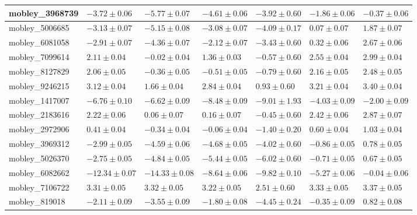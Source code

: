 \documentclass{article}
\begin{document}
\begin{landscape}
\begin{longtable}{|l{3.0cm}|l{3.0cm}|l{3.2cm}|l{3.6cm}|l{3.0cm}|l{3.0cm}|l{3.0cm}|}
mobley\_3968739	&	$	-3.72	\pm	0.06	$	&	$	-5.77	\pm	0.07	$	&	$	-4.61	\pm	0.06	$	&	$	-3.92	\pm	0.60	$	&	$	-1.86	\pm	0.06	$	&	$	-0.37	\pm	0.06	$	\\ \hline
mobley\_5006685	&	$	-3.13	\pm	0.07	$	&	$	-5.15	\pm	0.08	$	&	$	-3.08	\pm	0.07	$	&	$	-4.09	\pm	0.17	$	&	$	0.07	\pm	0.07	$	&	$	1.87	\pm	0.07	$	\\ \hline
mobley\_6081058	&	$	-2.91	\pm	0.07	$	&	$	-4.36	\pm	0.07	$	&	$	-2.12	\pm	0.07	$	&	$	-3.43	\pm	0.60	$	&	$	0.32	\pm	0.06	$	&	$	2.67	\pm	0.06	$	\\ \hline
mobley\_7099614	&	$	2.11	\pm	0.04	$	&	$	-0.02	\pm	0.04	$	&	$	1.36	\pm	0.03	$	&	$	-0.57	\pm	0.60	$	&	$	2.55	\pm	0.04	$	&	$	2.99	\pm	0.04	$	\\ \hline
mobley\_8127829	&	$	2.06	\pm	0.05	$	&	$	-0.36	\pm	0.05	$	&	$	-0.51	\pm	0.05	$	&	$	-0.79	\pm	0.60	$	&	$	2.16	\pm	0.05	$	&	$	2.48	\pm	0.05	$	\\ \hline
mobley\_9246215	&	$	3.12	\pm	0.04	$	&	$	1.66	\pm	0.04	$	&	$	2.84	\pm	0.04	$	&	$	0.93	\pm	0.60	$	&	$	3.21	\pm	0.04	$	&	$	3.40	\pm	0.04	$	\\ \hline
mobley\_1417007	&	$	-6.76	\pm	0.10	$	&	$	-6.62	\pm	0.09	$	&	$	-8.48	\pm	0.09	$	&	$	-9.01	\pm	1.93	$	&	$	-4.03	\pm	0.09	$	&	$	-2.00	\pm	0.09	$	\\ \hline
mobley\_2183616	&	$	2.22	\pm	0.06	$	&	$	0.06	\pm	0.07	$	&	$	0.16	\pm	0.07	$	&	$	-0.45	\pm	0.60	$	&	$	2.42	\pm	0.06	$	&	$	2.87	\pm	0.07	$	\\ \hline
mobley\_2972906	&	$	0.41	\pm	0.04	$	&	$	-0.34	\pm	0.04	$	&	$	-0.06	\pm	0.04	$	&	$	-1.40	\pm	0.20	$	&	$	0.60	\pm	0.04	$	&	$	1.03	\pm	0.04	$	\\ \hline
mobley\_3969312	&	$	-2.99	\pm	0.05	$	&	$	-4.59	\pm	0.06	$	&	$	-4.68	\pm	0.05	$	&	$	-4.02	\pm	0.60	$	&	$	-0.86	\pm	0.05	$	&	$	0.78	\pm	0.05	$	\\ \hline
mobley\_5026370	&	$	-2.75	\pm	0.05	$	&	$	-4.84	\pm	0.05	$	&	$	-5.44	\pm	0.05	$	&	$	-6.02	\pm	0.60	$	&	$	-0.71	\pm	0.05	$	&	$	0.67	\pm	0.05	$	\\ \hline
mobley\_6082662	&	$	-12.34	\pm	0.07	$	&	$	-14.33	\pm	0.08	$	&	$	-8.64	\pm	0.06	$	&	$	-9.82	\pm	0.10	$	&	$	-5.27	\pm	0.06	$	&	$	-0.04	\pm	0.06	$	\\ \hline
mobley\_7106722	&	$	3.31	\pm	0.05	$	&	$	3.32	\pm	0.05	$	&	$	3.22	\pm	0.05	$	&	$	2.51	\pm	0.60	$	&	$	3.33	\pm	0.05	$	&	$	3.37	\pm	0.05	$	\\ \hline
mobley\_819018	&	$	-2.11	\pm	0.09	$	&	$	-3.55	\pm	0.09	$	&	$	-1.80	\pm	0.08	$	&	$	-4.45	\pm	0.24	$	&	$	-0.35	\pm	0.09	$	&	$	0.82	\pm	0.08	$	\\ \hline

\end{longtable}
\end{landscape}
\end{document}
